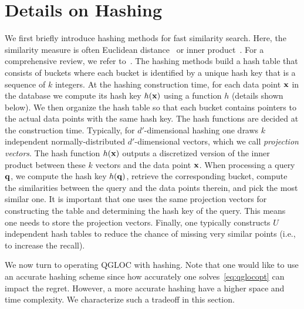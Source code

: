 \vspace{-5pt}
\section{Details on Hashing}
\label{sec:supp-hashing}
\vspace{-5pt}

We first briefly introduce hashing methods for fast similarity search.
Here, the similarity measure is often Euclidean distance~\cite{datar04locality} or inner product~\cite{shrivastava14asymmetric}.
For a comprehensive review, we refer to~\citet{wang14hashing}.
The hashing methods build a hash table that consists of buckets where each bucket is identified by a unique hash key that is a sequence of $k$ integers.
At the hashing construction time, for each data point $\mathbf{x}$ in the database we compute its hash key $h(\mathbf{x})$ using a function $h$ (details shown below).
We then organize the hash table so that each bucket contains pointers to the actual data points with the same hash key.
The hash functions are decided at the construction time.
Typically, for $d'$-dimensional hashing one draws $k$ independent normally-distributed $d'$-dimensional vectors, which we call \emph{projection vectors}.
The hash function $h(\mathbf{x})$ outputs a discretized version of the inner product between these $k$ vectors and the data point $\mathbf{x}$.
When processing a query ${{\mathbf q}}$, we compute the hash key $h({{\mathbf q}})$, retrieve the corresponding bucket, compute the similarities between the query and the data points therein, and pick the most similar one. 
It is important that one uses the same projection vectors for constructing the table and determining the hash key of the query.
This means one needs to store the projection vectors.
Finally, one typically constructs $U$ independent hash tables to reduce the chance of missing very similar points (i.e., to increase the recall).

We now turn to operating QGLOC with hashing.
Note that one would like to use an accurate hashing scheme since how accurately one solves~\eqref{eq:qglocopt} can impact the regret.
However, a more accurate hashing have a higher space and time complexity.
We characterize such a tradeoff in this section.

